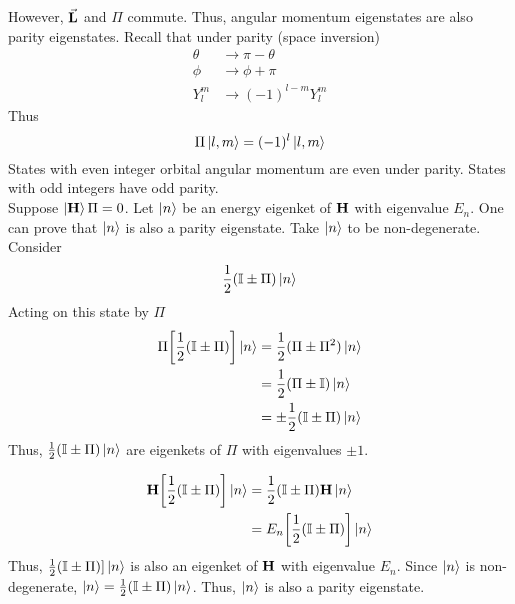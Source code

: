 \documentclass[12pt,a4paper,titlepage]{article}
\begin{document}
However, $\vec{\vb{L}}$ and $\Pi$ commute. Thus, angular momentum eigenstates are also parity eigenstates. Recall that under parity (space inversion)
\begin{equation}
\begin{aligned}
\theta&\rightarrow\pi-\theta\\
\phi&\rightarrow\phi+\pi\\
Y_{l}^{m}&\rightarrow(-1)^{l-m}Y_{l}^{m}
\end{aligned}
\end{equation}
Thus
\begin{equation}
\Pi\ket{l,m}=(-1)^{l}\ket{l,m}
\end{equation}
States with even integer orbital angular momentum are even under parity. States with odd integers have odd parity.\\

Suppose $\ket{\vb{H}}{\Pi}=0$. Let $\ket{n}$ be an energy eigenket of $\vb{H}$ with eigenvalue $E_{n}$. One can prove that $\ket{n}$ is also a parity eigenstate. Take $\ket{n}$ to be non-degenerate. Consider
\[
\frac{1}{2}(\mathbb{I}\pm\Pi)\ket{n}
\]
Acting on this state by $\Pi$
\begin{equation}
\begin{aligned}
\Pi\qty[\frac{1}{2}(\mathbb{I}\pm\Pi)]\ket{n}&=\frac{1}{2}(\Pi\pm\Pi^{2})\ket{n}\\
&=\frac{1}{2}(\Pi\pm\mathbb{I})\ket{n}\\
&=\pm\frac{1}{2}(\mathbb{I}\pm\Pi)\ket{n}
\end{aligned}
\end{equation}
Thus, $\frac{1}{2}(\mathbb{I}\pm\Pi)\ket{n}$ are eigenkets of $\Pi$ with eigenvalues $\pm1$.

\begin{equation}
\begin{aligned}
\vb{H}\qty[\frac{1}{2}(\mathbb{I}\pm\Pi)]\ket{n}&=\frac{1}{2}(\mathbb{I}\pm\Pi)\vb{H}\ket{n}\\
&=E_{n}\qty[\frac{1}{2}(\mathbb{I}\pm\Pi)]\ket{n}
\end{aligned}
\end{equation}
Thus, $\frac{1}{2}(\mathbb{I}\pm\Pi)]\ket{n}$ is also an eigenket of $\vb{H}$ with eigenvalue $E_{n}$. Since $\ket{n}$ is non-degenerate, $\ket{n}=\frac{1}{2}(\mathbb{I}\pm\Pi)\ket{n}$. Thus, $\ket{n}$ is also a parity eigenstate.\\
\end{document}
